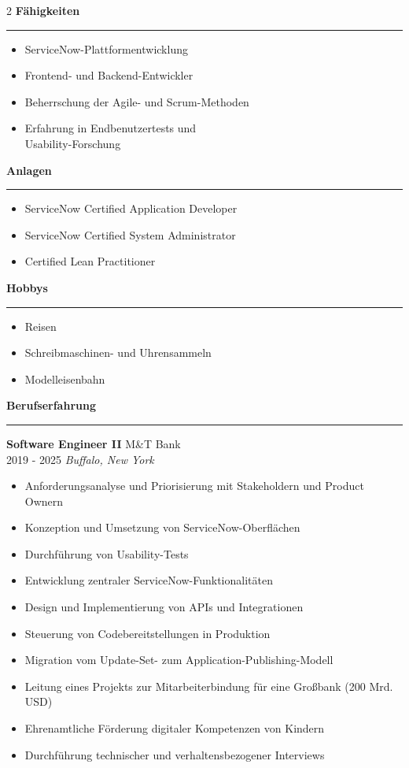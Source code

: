 \documentclass[a4paper,10pt]{article}
\newcommand{\sect}[1]{\vspace{9pt}\textbf{\large #1}\vspace{-10pt}\par\textcolor{maincolor}{\rule{\linewidth}{0.8pt}}\vspace{4pt}}
\begin{document}
\begin{paracol}{2}
\sect{Fähigkeiten}
\begin{itemize}
    \item ServiceNow-Plattformentwicklung
    \item Frontend- und Backend-Entwickler
    \item Beherrschung der Agile- und Scrum-Methoden
    \item Erfahrung in Endbenutzertests und\\ Usability-Forschung
\end{itemize}

\sect{Anlagen}
\begin{itemize}
    \item ServiceNow Certified Application Developer
    \item ServiceNow Certified System Administrator
    \item Certified Lean Practitioner
\end{itemize}

\sect{Hobbys}
\begin{itemize}
    \item Reisen
    \item Schreibmaschinen- und Uhrensammeln
    \item Modelleisenbahn
\end{itemize}

\switchcolumn


\sect{Berufserfahrung}

\textbf{Software Engineer II} \hfill M\&T Bank\\
2019 - 2025 \hfill \textit{Buffalo, New York}\par
\begin{itemize}
    \item Anforderungsanalyse und Priorisierung mit Stakeholdern und Product Ownern  
    \item Konzeption und Umsetzung von ServiceNow-Oberflächen  
    \item Durchführung von Usability-Tests  
    \item Entwicklung zentraler ServiceNow-Funktionalitäten  
    \item Design und Implementierung von APIs und Integrationen  
    \item Steuerung von Codebereitstellungen in Produktion  
    \item Migration vom Update-Set- zum Application-Publishing-Modell  
    \item Leitung eines Projekts zur Mitarbeiterbindung für eine Großbank (200 Mrd. USD)  
    \item Ehrenamtliche Förderung digitaler Kompetenzen von Kindern  
    \item Durchführung technischer und verhaltensbezogener Interviews
\end{itemize}
\medskip


\end{paracol}
\end{document}
